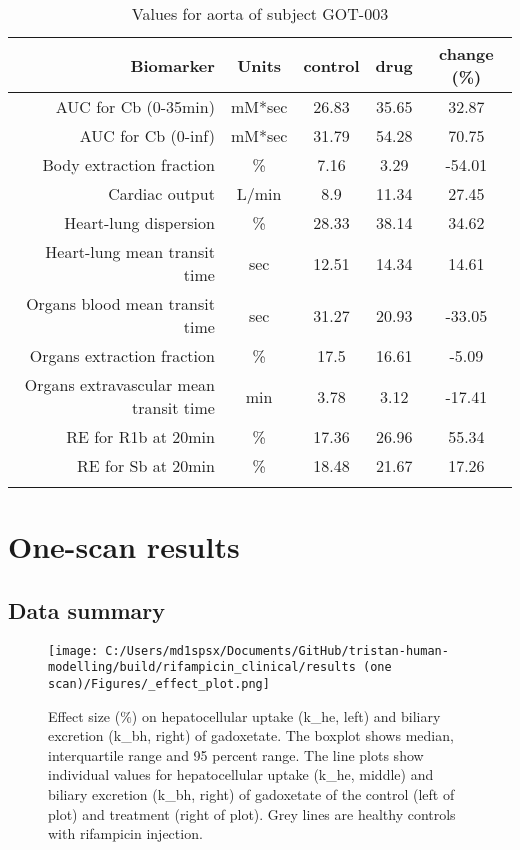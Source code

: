 \documentclass{epflreport}%
\begin{document}
\begin{longtable}{rcccc}%
\hline%
Biomarker&Units&control&drug&change (\%)\\%
\hline%
AUC for Cb (0{-}35min)&mM*sec&26.83&35.65&32.87\\%
AUC for Cb (0{-}inf)&mM*sec&31.79&54.28&70.75\\%
Body extraction fraction&\%&7.16&3.29&{-}54.01\\%
Cardiac output&L/min&8.9&11.34&27.45\\%
Heart{-}lung dispersion&\%&28.33&38.14&34.62\\%
Heart{-}lung mean transit time&sec&12.51&14.34&14.61\\%
Organs blood mean transit time&sec&31.27&20.93&{-}33.05\\%
Organs extraction fraction&\%&17.5&16.61&{-}5.09\\%
Organs extravascular mean transit time&min&3.78&3.12&{-}17.41\\%
RE for R1b at 20min&\%&17.36&26.96&55.34\\%
RE for Sb at 20min&\%&18.48&21.67&17.26\\%
\hline%
\caption{Values for aorta of subject GOT-003} \\%
\end{longtable}%
\clearpage%
\chapter{One{-}scan results}%
\section{Data summary}%
\label{sec:Datasummary}%

%


\begin{figure}[h!]%
\centering%
\texttt{[image: C:/Users/md1spsx/Documents/GitHub/tristan-human-modelling/build/rifampicin\_clinical/results (one scan)/Figures/\_effect\_plot.png]}%
\caption{Effect size (\%) on hepatocellular uptake (k\_he, left) and biliary excretion (k\_bh, right) of gadoxetate. The boxplot shows median, interquartile range and 95 percent range. The line plots show individual values for hepatocellular uptake (k\_he, middle) and biliary excretion (k\_bh, right) of gadoxetate of the control (left of plot) and treatment (right of plot). Grey lines are healthy controls with rifampicin injection.}%
\end{figure}
\end{document}
